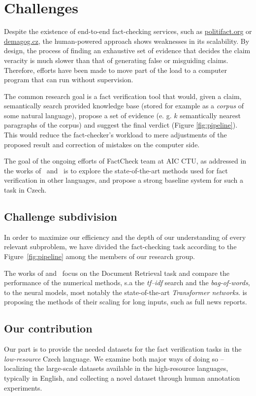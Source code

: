 \section{Challenges}
Despite the existence of end-to-end fact-checking services, such as \url{politifact.org} or \url{demagog.cz}, the human-powered approach shows weaknesses in its scalability. By design, the process of finding an exhaustive set of evidence that decides the claim veracity is much slower than that of generating false or misguiding claims. Therefore, efforts have been made to move part of the load to a computer program that can run without supervision.

The common research goal is a fact verification tool that would, given a claim, semantically search provided knowledge base (stored for example as a \textit{corpus} of some natural language), propose a set of evidence (e. g. $k$ semantically nearest paragraphs of the corpus) and suggest the final verdict (Figure \ref{fig:pipeline}). This would reduce the fact-checker's workload to mere adjustments of the proposed result and correction of mistakes on the computer side. 

The goal of the ongoing efforts of {\textsf{FactCheck}} team at {\textsf{AIC CTU}}, as addressed in the works of~\cite{rypar,dedkova} and~\cite{gazo} is to explore the state-of-the-art methods used for fact verification in other languages, and propose a strong baseline system for such a task in Czech.

\subsection{Challenge subdivision}
\label{sec:subdivision}
In order to maximize our efficiency and the depth of our understanding of every relevant subproblem, we have divided the fact-checking task according to the Figure~\ref{fig:pipeline} among the members of our research group. 

The works of \cite{rypar} and~\cite{dedkova} focus on the Document Retrieval task and compare the performance of the numerical methods, s.a the \textit{tf--idf} search and the \textit{bag-of-words}, to the neural models, most notably the state-of-the-art \textit{Transformer networks}\cite{vaswani}. \cite{gazo} is proposing the methods of their scaling for long inputs, such as full news reports.

\subsection{Our contribution}
Our part is to provide the needed datasets for the fact verification tasks in the \textit{low-resource} Czech language. We examine both major ways of doing so -- localizing the large-scale datasets available in the high-resource languages, typically in English, and collecting a novel dataset through human annotation experiments.

